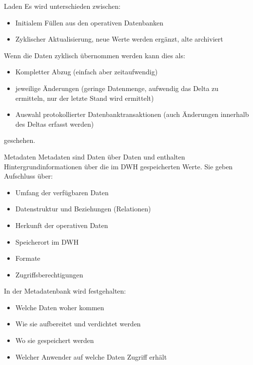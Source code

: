 \documentclass[a6paper,10pt,grid=front%
,toc
]{kartei}
\begin{document}
  \begin{karte}{Laden}
    Es wird unterschieden zwischen:
    \begin{itemize}  
      \item Initialem Füllen aus den operativen Datenbanken
      \item Zyklischer Aktualisierung, neue Werte werden ergänzt, alte archiviert
    \end{itemize}

    Wenn die Daten zyklisch übernommen werden kann dies als:

    \begin{itemize}
      \item Kompletter Abzug (einfach aber zeitaufwendig)
      \item jeweilige Änderungen (geringe Datenmenge, aufwendig das Delta zu ermitteln, nur der letzte Stand wird ermittelt)
      \item Auswahl protokollierter Datenbanktransaktionen (auch Änderungen innerhalb des Deltas erfasst werden)
    \end{itemize}

    geschehen.
  \end{karte}

  \begin{karte}{Metadaten}
    Metadaten sind Daten über Daten und enthalten Hintergrundinformationen über die im DWH gespeicherten Werte. Sie geben Aufschluss über:
    \begin{itemize}
      \item Umfang der verfügbaren Daten
      \item Datenstruktur und Beziehungen (Relationen)
      \item Herkunft der operativen Daten
      \item Speicherort im DWH
      \item Formate
      \item Zugriffsberechtigungen      
    \end{itemize}

    In der Metadatenbank wird festgehalten:

    \begin{itemize}
      \item Welche Daten woher kommen
      \item Wie sie aufbereitet und verdichtet werden
      \item Wo sie gespeichert werden
      \item Welcher Anwender auf welche Daten Zugriff erhält
    \end{itemize}
  \end{karte}
\end{document}

